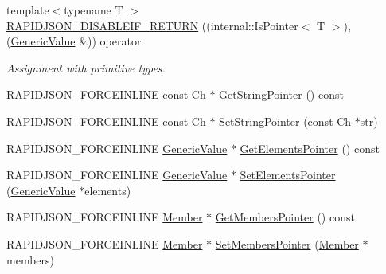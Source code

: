 \begin{DoxyCompactItemize}
\item 
{\footnotesize template$<$typename T $>$ }\\\mbox{\hyperlink{classrapidjson_1_1_generic_value_a5490b1fdb725744a6defb14ed7c238f0}{R\+A\+P\+I\+D\+J\+S\+O\+N\+\_\+\+D\+I\+S\+A\+B\+L\+E\+I\+F\+\_\+\+R\+E\+T\+U\+RN}} ((internal\+::\+Is\+Pointer$<$ T $>$),(\mbox{\hyperlink{classrapidjson_1_1_generic_value}{Generic\+Value}} \&)) operator
\begin{DoxyCompactList}\small\item\em Assignment with primitive types. \end{DoxyCompactList}\item 
R\+A\+P\+I\+D\+J\+S\+O\+N\+\_\+\+F\+O\+R\+C\+E\+I\+N\+L\+I\+NE const \mbox{\hyperlink{classrapidjson_1_1_generic_value_adcdbc7fa85a9a41b78966d7e0dcc2ac4}{Ch}} $\ast$ \mbox{\hyperlink{classrapidjson_1_1_generic_value_acabebdf345b82c2bd8c1bbe1a2d3ddfe}{Get\+String\+Pointer}} () const
\item 
R\+A\+P\+I\+D\+J\+S\+O\+N\+\_\+\+F\+O\+R\+C\+E\+I\+N\+L\+I\+NE const \mbox{\hyperlink{classrapidjson_1_1_generic_value_adcdbc7fa85a9a41b78966d7e0dcc2ac4}{Ch}} $\ast$ \mbox{\hyperlink{classrapidjson_1_1_generic_value_acaffec8b0ccdcac629740f0bd5a7b301}{Set\+String\+Pointer}} (const \mbox{\hyperlink{classrapidjson_1_1_generic_value_adcdbc7fa85a9a41b78966d7e0dcc2ac4}{Ch}} $\ast$str)
\item 
R\+A\+P\+I\+D\+J\+S\+O\+N\+\_\+\+F\+O\+R\+C\+E\+I\+N\+L\+I\+NE \mbox{\hyperlink{classrapidjson_1_1_generic_value}{Generic\+Value}} $\ast$ \mbox{\hyperlink{classrapidjson_1_1_generic_value_af2475845538fccc217d8cf3e94d6a5e0}{Get\+Elements\+Pointer}} () const
\item 
R\+A\+P\+I\+D\+J\+S\+O\+N\+\_\+\+F\+O\+R\+C\+E\+I\+N\+L\+I\+NE \mbox{\hyperlink{classrapidjson_1_1_generic_value}{Generic\+Value}} $\ast$ \mbox{\hyperlink{classrapidjson_1_1_generic_value_a019c4c8beb3c6d675a03f2f72ba9c6b8}{Set\+Elements\+Pointer}} (\mbox{\hyperlink{classrapidjson_1_1_generic_value}{Generic\+Value}} $\ast$elements)
\item 
R\+A\+P\+I\+D\+J\+S\+O\+N\+\_\+\+F\+O\+R\+C\+E\+I\+N\+L\+I\+NE \mbox{\hyperlink{classrapidjson_1_1_generic_value_a0220ddebe2f023fa75b643a50e90e559}{Member}} $\ast$ \mbox{\hyperlink{classrapidjson_1_1_generic_value_a1f56ed626112cc824a93b6c29afc0cea}{Get\+Members\+Pointer}} () const
\item 
R\+A\+P\+I\+D\+J\+S\+O\+N\+\_\+\+F\+O\+R\+C\+E\+I\+N\+L\+I\+NE \mbox{\hyperlink{classrapidjson_1_1_generic_value_a0220ddebe2f023fa75b643a50e90e559}{Member}} $\ast$ \mbox{\hyperlink{classrapidjson_1_1_generic_value_a19199230941f1fe59b5b6a27281fcd1b}{Set\+Members\+Pointer}} (\mbox{\hyperlink{classrapidjson_1_1_generic_value_a0220ddebe2f023fa75b643a50e90e559}{Member}} $\ast$members)

\end{DoxyCompactItemize}
